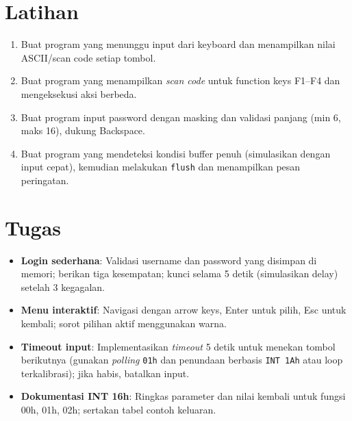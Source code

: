 \section{Latihan}
\begin{enumerate}
  \item Buat program yang menunggu input dari keyboard dan menampilkan nilai ASCII/scan code setiap tombol.
  \item Buat program yang menampilkan \textit{scan code} untuk function keys F1--F4 dan mengeksekusi aksi berbeda.
  \item Buat program input password dengan masking dan validasi panjang (min 6, maks 16), dukung Backspace.
  \item Buat program yang mendeteksi kondisi buffer penuh (simulasikan dengan input cepat), kemudian melakukan \texttt{flush} dan menampilkan pesan peringatan.
\end{enumerate}

\section{Tugas}
\begin{itemize}
  \item \textbf{Login sederhana}: Validasi username dan password yang disimpan di memori; berikan tiga kesempatan; kunci selama 5 detik (simulasikan delay) setelah 3 kegagalan.
  \item \textbf{Menu interaktif}: Navigasi dengan arrow keys, Enter untuk pilih, Esc untuk kembali; sorot pilihan aktif menggunakan warna.
  \item \textbf{Timeout input}: Implementasikan \textit{timeout} 5 detik untuk menekan tombol berikutnya (gunakan \textit{polling} \texttt{01h} dan penundaan berbasis \texttt{INT 1Ah} atau loop terkalibrasi); jika habis, batalkan input.
  \item \textbf{Dokumentasi INT 16h}: Ringkas parameter dan nilai kembali untuk fungsi 00h, 01h, 02h; sertakan tabel contoh keluaran.
\end{itemize}


